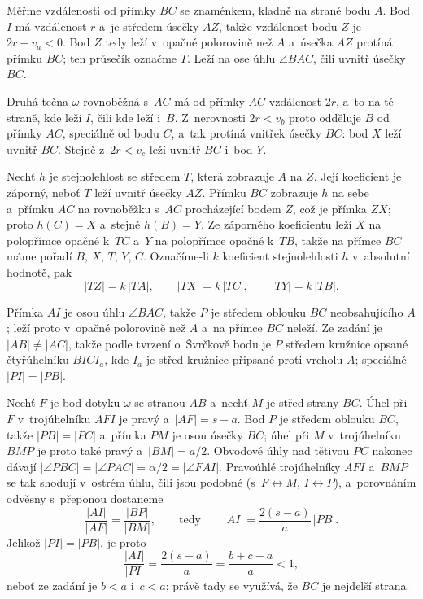 {    Měřme vzdálenosti od přímky $BC$ se znaménkem, kladně na straně bodu $A$. Bod $I$ má vzdálenost $r$ a~je středem úsečky $AZ$, takže vzdálenost bodu $Z$ je $2r - v_a < 0$. Bod $Z$ tedy leží v~opačné polorovině než $A$ a~úsečka $AZ$ protíná přímku $BC$; ten průsečík označme $T$. Leží na ose úhlu $\angle BAC$, čili uvnitř úsečky $BC$.

    Druhá tečna $\omega$ rovnoběžná s~$AC$ má od přímky $AC$ vzdálenost $2r$, a~to na té straně, kde leží $I$, čili kde leží i~$B$. Z~nerovnosti $2r < v_b$ proto odděluje $B$ od přímky $AC$, speciálně od bodu $C$, a~tak protíná vnitřek úsečky $BC$: bod $X$ leží uvnitř $BC$. Stejně z~$2r < v_c$ leží uvnitř $BC$ i~bod $Y$.

    Nechť $h$ je stejnolehlost se středem $T$, která zobrazuje $A$ na $Z$. Její koeficient je záporný, neboť $T$ leží uvnitř úsečky $AZ$. Přímku $BC$ zobrazuje $h$ na sebe a~přímku $AC$ na rovnoběžku s~$AC$ procházející bodem $Z$, což je přímka $ZX$; proto $h(C) = X$ a~stejně $h(B) = Y$. Ze záporného koeficientu leží $X$ na polopřímce opačné k~$TC$ a~$Y$ na polopřímce opačné k~$TB$, takže na přímce $BC$ máme pořadí $B$, $X$, $T$, $Y$, $C$. Označíme-li $k$ koeficient stejnolehlosti $h$ v~absolutní hodnotě, pak
    $$
    |TZ| = k \, |TA|, \qquad |TX| = k \, |TC|, \qquad |TY| = k \, |TB|.
    $$

    Přímka $AI$ je osou úhlu $\angle BAC$, takže $P$ je středem oblouku $BC$ neobsahujícího $A$; leží proto v~opačné polorovině než $A$ a~na přímce $BC$ neleží. Ze zadání je $|AB| \neq |AC|$, takže podle tvrzení o~Švrčkově bodu je $P$ středem kružnice opsané čtyřúhelníku $BICI_a$, kde $I_a$ je střed kružnice připsané proti vrcholu $A$; speciálně $|PI| = |PB|$.

    Nechť $F$ je bod dotyku $\omega$ se stranou $AB$ a~nechť $M$ je střed strany $BC$. Úhel při $F$ v~trojúhelníku $AFI$ je pravý a~$|AF| = s - a$. Bod $P$ je středem oblouku $BC$, takže $|PB| = |PC|$ a~přímka $PM$ je osou úsečky $BC$; úhel při $M$ v~trojúhelníku $BMP$ je proto také pravý a~$|BM| = a/2$. Obvodové úhly nad tětivou $PC$ nakonec dávají $|\angle PBC| = |\angle PAC| = \alpha/2 = |\angle FAI|$. Pravoúhlé trojúhelníky $AFI$ a~$BMP$ se tak shodují v~ostrém úhlu, čili jsou podobné (s~$F \leftrightarrow M$, $I \leftrightarrow P$), a~porovnáním odvěsny s~přeponou dostaneme
    $$
    \frac{|AI|}{|AF|} = \frac{|BP|}{|BM|}, \qquad \text{tedy} \qquad |AI| = \frac{2(s-a)}{a}\,|PB|.
    $$
    Jelikož $|PI| = |PB|$, je proto
    $$
    \frac{|AI|}{|PI|} = \frac{2(s-a)}{a} = \frac{b+c-a}{a} < 1,
    $$
    neboť ze zadání je $b < a$ i~$c < a$; právě tady se využívá, že $BC$ je nejdelší strana.

}
